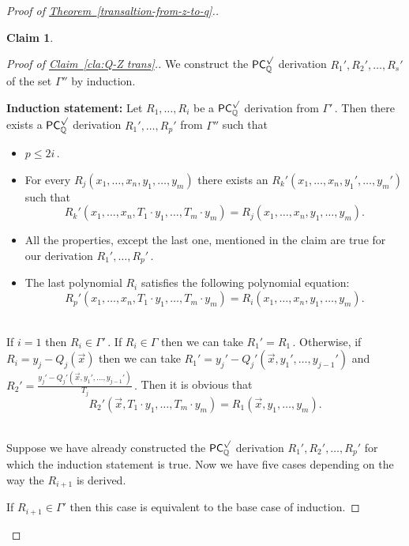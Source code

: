 \documentclass[11pt]{article}
\newcommand{\expref}[2]{\texorpdfstring{\hyperref[#2]{#1~\ref{#2}}}{#1~\ref{#2}}}
\newtheorem{claim}[theorem]{Claim}
\newcommand{\Q}{{\mathbb Q}}
\begin{document}
\begin{proof}[Proof of \expref{Theorem}{transaltion-from-z-to-q}.]
\begin{claim}
\end{claim}

\begin{proof}[Proof of \expref{Claim}{cla:Q-Z trans}.]
%
We construct the $\mathsf{PC}_{\Q}^{\surd}$ derivation %
$R_1', R_2', \ldots, R_{s}'$ %
 of the set $\Gamma''$ by induction. \smallskip

\noindent\textbf{Induction statement:} 
Let %
$R_1, \ldots, R_i$ %
 be a $\mathsf{PC}_{\Q}^{\surd}$ derivation from %
$\Gamma'\,.$ %
 Then there exists a $\mathsf{PC}_{\Q}^{\surd}$ derivation %
$R_1', \ldots, R_p'$ %
 from $\Gamma''$ such that
\begin{itemize}
    \item %
$p \le 2 i\,.$ %
    \item For every $R_j(x_1, \ldots, x_n, y_1, \ldots, y_m)$ there exists an $R_k'(x_1, \ldots, x_n, y_1', \ldots, y_m')$ such that %
    $$
    R_k'(x_1, \ldots, x_n, T_1 \cdot y_1, \ldots, T_m \cdot y_m) = R_j(x_1, \ldots, x_n, y_1, \ldots, y_m).
    $$
    \item All the properties, except the last one, mentioned in the claim are true for our derivation %
$R_1', \ldots, R_p'\,.$ %
    \item 
    The last polynomial $R_i$ satisfies the following polynomial equation: %
    $$
    R_p'(x_1, \ldots, x_n, T_1 \cdot y_1, \ldots, T_m \cdot y_m) = R_i(x_1, \ldots, x_n, y_1, \ldots, y_m).
    $$
\end{itemize}

\mbox{}\\  If $i = 1$ then %
$R_i \in \Gamma'\,.$ %
 If $R_i \in \Gamma$ then we can take %
$R_1' = R_1\,.$ %
 Otherwise, if $R_i = y_j - Q_j(\vec x)$ then we can take $R_1' = y_j' - Q_j'(\vec x, y_1', \ldots, y_{j - 1}')$ and %
$R_2' = \frac{y_j' - Q_j'(\vec x, y_1', \ldots, y_{j - 1}')}{T_j}\,.$ %
%
Then it is obvious that %
$$
R_2'(\vec x, T_1 \cdot y_1, \ldots, T_m \cdot y_m) = R_1(\vec x, y_1, \ldots, y_m).
$$

\mbox{}\\  Suppose we have already constructed the $\mathsf{PC}_{\Q}^{\surd}$ derivation %
$R_1', R_2', \ldots, R_{p}'$ %
 for which the induction statement is true. Now we have five cases depending on the way the $R_{i + 1}$ is derived.

 If $R_{i + 1} \in \Gamma'$ then this case is equivalent to the base case of induction. 


\end{proof}
\end{proof}
\end{document}
